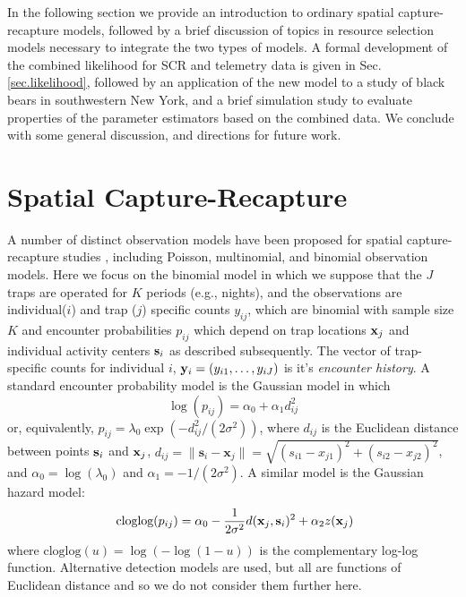\documentclass[12pt]{article}
\begin{document}
In the following section we provide an introduction to ordinary
spatial capture-recapture models, followed by a brief discussion of
topics in resource selection models necessary to integrate the two
types of models. A formal development of the combined likelihood for
SCR and telemetry data is given in Sec. \ref{sec.likelihood}, followed
by an application of the new model to a study of black bears in
southwestern New York, and a brief simulation study to evaluate
properties of the parameter estimators based on the combined data. We
conclude with some general discussion, and directions for future work.


\section{Spatial Capture-Recapture}

A number of distinct observation models have been proposed for spatial
capture-recapture studies \citep{borchers_efford:2008,
  royle_etal:2009ecol, efford_etal:2009ecol}, including Poisson,
multinomial, and binomial observation models.
Here we focus on the binomial model in which we suppose that the $J$
traps
are operated for $K$ periods (e.g., nights), and the observations are
individual($i$) and trap ($j$) specific counts $y_{ij}$, which are binomial with
sample size $K$ and encounter probabilities $p_{ij}$ which depend on
trap locations ${\bf x}_{j}$ and individual activity centers ${\bf
  s}_{i}$ as described subsequently.  The vector of trap-specific
counts for individual $i$, ${\bf y}_{i} = (y_{i1},\ldots,y_{iJ})$ is
it's {\it encounter history}.  A standard encounter probability model
\citep{borchers_efford:2008} is the Gaussian model in which
\begin{equation}
\log(p_{ij})= \alpha_{0} + \alpha_{1} d_{ij}^{2}
\label{eq.encounter}
\end{equation}
or, equivalently,
$p_{ij} = \lambda_{0} \exp(-d_{ij}^{2} /(2\sigma^{2}) )$,
where %
$d_{ij}$ is the Euclidean
distance between points ${\bf s}_{i}$ and ${\bf x}_{j}$,
$d_{ij} = \|\textbf{s}_i - \textbf{x}_j\| = \sqrt{(s_{i1}-x_{j1})^2 +
  (s_{i2}-x_{j2})^2}$,
and
 $\alpha_{0} = \log(\lambda_{0})$ and $\alpha_{1} = -1/(2\sigma^2)$.
A similar model is the Gaussian hazard model:
\begin{equation}
\mbox{ cloglog}(p_{ij}) = \alpha_{0}  -\frac{1}{2\sigma^{2}}
d({\bf x}_{j},{\bf s}_{i})^{2} + \alpha_{2}  z({\bf x}_{j})
\label{eq.hazard}
\end{equation}
where $\mbox{cloglog}(u) = \log(-\log(1-u))$ is the complementary
log-log function.
Alternative detection models are used, but all are
functions of Euclidean distance and so we do not consider them
further here.
\end{document}
